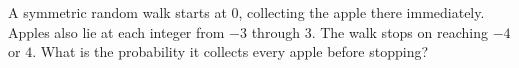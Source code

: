 A symmetric random walk starts at $0$, collecting the apple there immediately. Apples also lie at each integer from $-3$ through $3$. The walk stops on reaching $-4$ or $4$. What is the probability it collects every apple before stopping?
